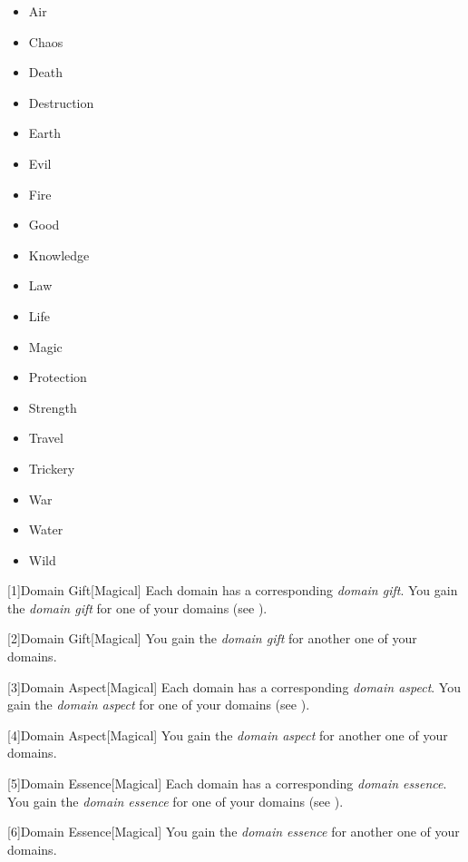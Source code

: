         \begin{itemize}
            \item{Air}
            \item{Chaos}
            \item{Death}
            \item{Destruction}
            \item{Earth}
            \item{Evil}
            \item{Fire}
            \item{Good}
            \item{Knowledge}
            \item{Law}
            \item{Life}
            \item{Magic}
            \item{Protection}
            \item{Strength}
            \item{Travel}
            \item{Trickery}
            \item{War}
            \item{Water}
            \item{Wild}
        \end{itemize}

        [1]{Domain Gift}[Magical]
        Each domain has a corresponding \textit{domain gift}.
        You gain the \textit{domain gift} for one of your domains (see ).

        [2]{Domain Gift}[Magical]
        You gain the \textit{domain gift} for another one of your domains.

        [3]{Domain Aspect}[Magical]
        Each domain has a corresponding \textit{domain aspect}.
        You gain the \textit{domain aspect} for one of your domains (see ).

        [4]{Domain Aspect}[Magical]
        You gain the \textit{domain aspect} for another one of your domains.

        [5]{Domain Essence}[Magical]
        Each domain has a corresponding \textit{domain essence}.
        You gain the \textit{domain essence} for one of your domains (see ).

        [6]{Domain Essence}[Magical]
        You gain the \textit{domain essence} for another one of your domains.

